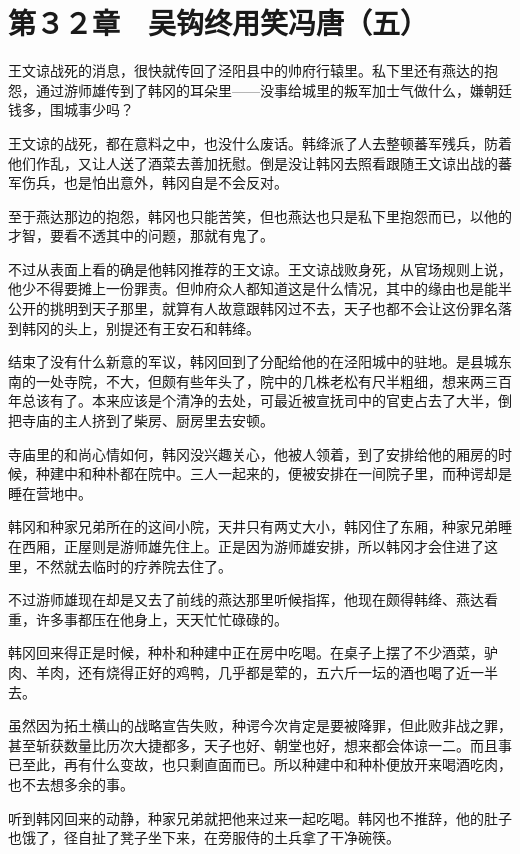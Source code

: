 \section{第３２章　吴钩终用笑冯唐（五）}

王文谅战死的消息，很快就传回了泾阳县中的帅府行辕里。私下里还有燕达的抱怨，通过游师雄传到了韩冈的耳朵里——没事给城里的叛军加士气做什么，嫌朝廷钱多，围城事少吗？

王文谅的战死，都在意料之中，也没什么废话。韩绛派了人去整顿蕃军残兵，防着他们作乱，又让人送了酒菜去善加抚慰。倒是没让韩冈去照看跟随王文谅出战的蕃军伤兵，也是怕出意外，韩冈自是不会反对。

至于燕达那边的抱怨，韩冈也只能苦笑，但也燕达也只是私下里抱怨而已，以他的才智，要看不透其中的问题，那就有鬼了。

不过从表面上看的确是他韩冈推荐的王文谅。王文谅战败身死，从官场规则上说，他少不得要摊上一份罪责。但帅府众人都知道这是什么情况，其中的缘由也是能半公开的挑明到天子那里，就算有人故意跟韩冈过不去，天子也都不会让这份罪名落到韩冈的头上，别提还有王安石和韩绛。

结束了没有什么新意的军议，韩冈回到了分配给他的在泾阳城中的驻地。是县城东南的一处寺院，不大，但颇有些年头了，院中的几株老松有尺半粗细，想来两三百年总该有了。本来应该是个清净的去处，可最近被宣抚司中的官吏占去了大半，倒把寺庙的主人挤到了柴房、厨房里去安顿。

寺庙里的和尚心情如何，韩冈没兴趣关心，他被人领着，到了安排给他的厢房的时候，种建中和种朴都在院中。三人一起来的，便被安排在一间院子里，而种谔却是睡在营地中。

韩冈和种家兄弟所在的这间小院，天井只有两丈大小，韩冈住了东厢，种家兄弟睡在西厢，正屋则是游师雄先住上。正是因为游师雄安排，所以韩冈才会住进了这里，不然就去临时的疗养院去住了。

不过游师雄现在却是又去了前线的燕达那里听候指挥，他现在颇得韩绛、燕达看重，许多事都压在他身上，天天忙忙碌碌的。

韩冈回来得正是时候，种朴和种建中正在房中吃喝。在桌子上摆了不少酒菜，驴肉、羊肉，还有烧得正好的鸡鸭，几乎都是荤的，五六斤一坛的酒也喝了近一半去。

虽然因为拓土横山的战略宣告失败，种谔今次肯定是要被降罪，但此败非战之罪，甚至斩获数量比历次大捷都多，天子也好、朝堂也好，想来都会体谅一二。而且事已至此，再有什么变故，也只剩直面而已。所以种建中和种朴便放开来喝酒吃肉，也不去想多余的事。

听到韩冈回来的动静，种家兄弟就把他来过来一起吃喝。韩冈也不推辞，他的肚子也饿了，径自扯了凳子坐下来，在旁服侍的土兵拿了干净碗筷。


